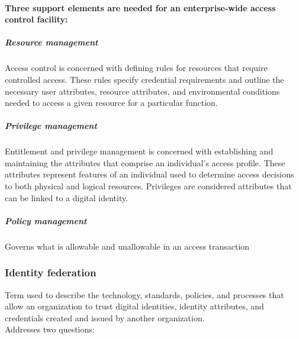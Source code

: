 \documentclass{article}
\begin{document}
                                    \paragraph{Three support
                                    elements are
                                    needed for an
                                    enterprise-wide
                                    access control
                                    facility:}

                                    \subparagraph{Resource management}
                                    Access control is concerned with defining rules for resources that require controlled access. These rules specify credential requirements and outline the necessary user attributes, resource attributes, and environmental conditions needed to access a given resource for a particular function.

                                    \subparagraph{Privilege management}
                                    Entitlement and privilege management is concerned with establishing and maintaining the attributes that comprise an individual's access profile. These attributes represent features of an individual used to determine access decisions to both physical and logical resources. Privileges are considered attributes that can be linked to a digital identity.



                                    \subparagraph{Policy management}
                                    Governs what is allowable and unallowable in an access transaction
                            \subsubsection{Identity
                            federation} Term used to describe the technology, standards,
                            policies, and processes that allow an organization
                            to trust digital identities, identity attributes, and
                            credentials created and issued by another
                            organization. \\
                            Addresses two questions:
\end{document}
